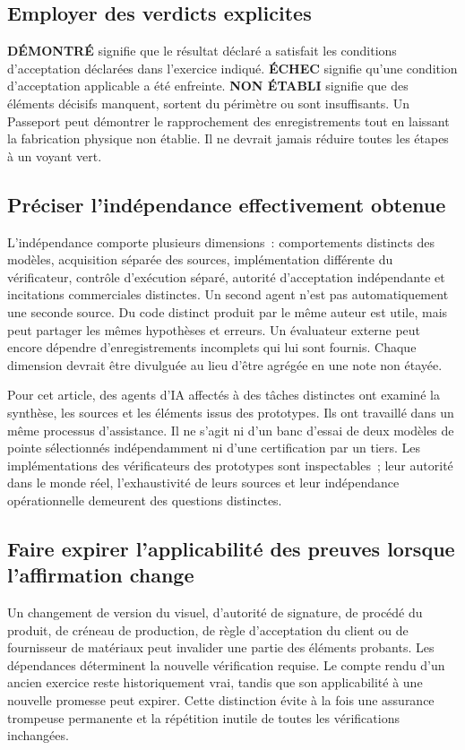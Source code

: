\documentclass[11pt,a4paper]{article}
\newcommand{\status}[1]{\textsf{\textbf{#1}}}
\begin{document}
\subsection{Employer des verdicts explicites}
\status{DÉMONTRÉ} signifie que le résultat déclaré a satisfait les conditions d’acceptation déclarées dans l’exercice indiqué. \status{ÉCHEC} signifie qu’une condition d’acceptation applicable a été enfreinte. \status{NON ÉTABLI} signifie que des éléments décisifs manquent, sortent du périmètre ou sont insuffisants. Un Passeport peut démontrer le rapprochement des enregistrements tout en laissant la fabrication physique non établie. Il ne devrait jamais réduire toutes les étapes à un voyant vert.

\subsection{Préciser l’indépendance effectivement obtenue}
L’indépendance comporte plusieurs dimensions~: comportements distincts des modèles, acquisition séparée des sources, implémentation différente du vérificateur, contrôle d’exécution séparé, autorité d’acceptation indépendante et incitations commerciales distinctes. Un second agent n’est pas automatiquement une seconde source. Du code distinct produit par le même auteur est utile, mais peut partager les mêmes hypothèses et erreurs. Un évaluateur externe peut encore dépendre d’enregistrements incomplets qui lui sont fournis. Chaque dimension devrait être divulguée au lieu d’être agrégée en une note non étayée.

Pour cet article, des agents d’IA affectés à des tâches distinctes ont examiné la synthèse, les sources et les éléments issus des prototypes. Ils ont travaillé dans un même processus d’assistance. Il ne s’agit ni d’un banc d’essai de deux modèles de pointe sélectionnés indépendamment ni d’une certification par un tiers. Les implémentations des vérificateurs des prototypes sont inspectables~; leur autorité dans le monde réel, l’exhaustivité de leurs sources et leur indépendance opérationnelle demeurent des questions distinctes.

\subsection{Faire expirer l’applicabilité des preuves lorsque l’affirmation change}
Un changement de version du visuel, d’autorité de signature, de procédé du produit, de créneau de production, de règle d’acceptation du client ou de fournisseur de matériaux peut invalider une partie des éléments probants. Les dépendances déterminent la nouvelle vérification requise. Le compte rendu d’un ancien exercice reste historiquement vrai, tandis que son applicabilité à une nouvelle promesse peut expirer. Cette distinction évite à la fois une assurance trompeuse permanente et la répétition inutile de toutes les vérifications inchangées.
\end{document}
